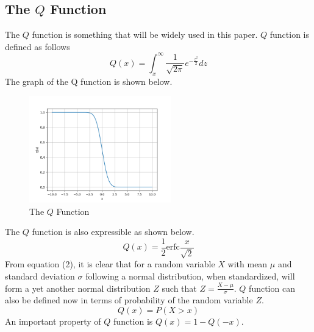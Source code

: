 \documentclass[twocolumn]{report}
\begin{document}
\subsection{The $Q$ Function}
The $Q$ function is something that will be widely used in this paper. $Q$ function is defined as follows
\begin{equation}
\displaystyle Q(x) = \int_{x}^{\infty}\frac{1}{\sqrt{2\pi}}e^{-\frac{z^{2}}{2}}dz
\end{equation}
The graph of the Q function is shown below.
\begin{figure}[H]
\includegraphics[width=0.55\textwidth, height=0.4\textwidth]{qfunc.png}
\caption{The $Q$ Function}
\end{figure}
The $Q$ function is also expressible as shown below.
\begin{equation}
Q(x) = \frac{1}{2}\textrm{erfc}{\frac{x}{\sqrt{2}}}
\end{equation}
From equation (2), it is clear that for a random variable $X$ with mean $\mu$ and standard deviation $\sigma$ following a normal distribution, when standardized, will form a yet another normal distribution $Z$ such that $\displaystyle Z = \frac{X-\mu}{\sigma}$. $Q$ function can also be defined now in terms of probability of the random variable $Z$.
\begin{equation}
Q(x) = P(X>x)
\end{equation}
An important property of $Q$ function is $Q(x) = 1 - Q(-x)$.
\end{document}
